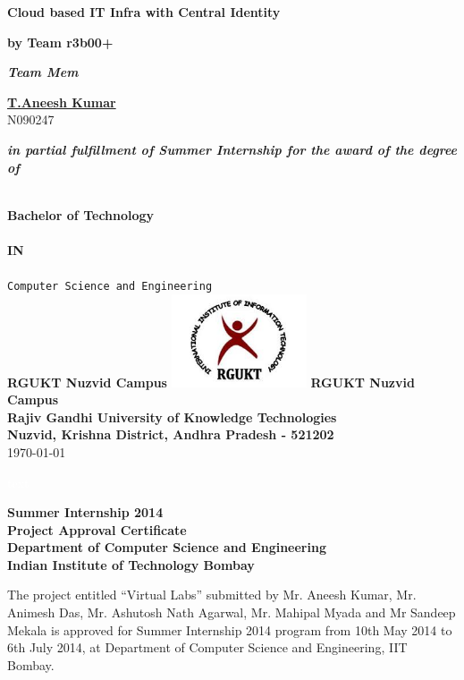 \documentclass[12pt]{report}
\begin{document}
\begin{titlepage}
 \begin{center}
 
\fontsize{20pt}{10pt}
\textbf{Cloud based IT Infra with Central Identity} 

\fontsize{14pt}{10pt}
\vfill
\textbf{by Team r3b00+}
\vfill

\fontsize{12pt}{10pt}
\textit{\textbf{Team Mem}}

\vfill
\fontsize{16pt}{10pt}
\underline{\textbf{T.Aneesh Kumar}} \\ 
\fontsize{14pt}{10pt}
N090247 

\renewcommand{\baselinestretch}{1.50}\normalsize
\vfill
\fontsize{12pt}{10pt}
\textit{\textbf{in partial fulfillment of Summer Internship for the award of the degree of}}  

\vfill
\fontsize{16pt}{10pt}
\textbf{\\ Bachelor of Technology \\} 
\fontsize{14pt}{10pt}
\textbf{\\ IN \\} 
\fontsize{14pt}{10pt}
\texttt{\\ Computer Science and Engineering \\ }
\textbf{RGUKT Nuzvid Campus } 
\vfill
\includegraphics[width=4cm]{rgukt_logo.jpg} 
\vfill
\textbf{RGUKT Nuzvid Campus } \\
\textbf{Rajiv Gandhi University of Knowledge Technologies} \\
\textbf{Nuzvid, Krishna District, Andhra Pradesh - 521202} \\

\vfill
\today
\end{center}
\end{titlepage}

 \pagebreak \textcolor{white}{text} \pagebreak
\thispagestyle{empty}

\begin{center}
\thispagestyle{empty}
\LARGE
\textbf{Summer Internship 2014 \\ Project Approval Certificate} \\
\vskip12pt
\Large
\textbf{Department of Computer Science and Engineering} \\
\vskip5pt
\textbf{Indian Institute of Technology Bombay} \\
\end{center}
\vfill
\normalsize
The project entitled ``Virtual Labs'' submitted by Mr. Aneesh Kumar, Mr. Animesh Das, Mr. Ashutosh Nath Agarwal, Mr. Mahipal Myada and Mr Sandeep Mekala is approved for Summer Internship 2014 program from 10th May 2014 to 6th July 2014, at Department of Computer Science and Engineering, IIT Bombay.
\end{document}
